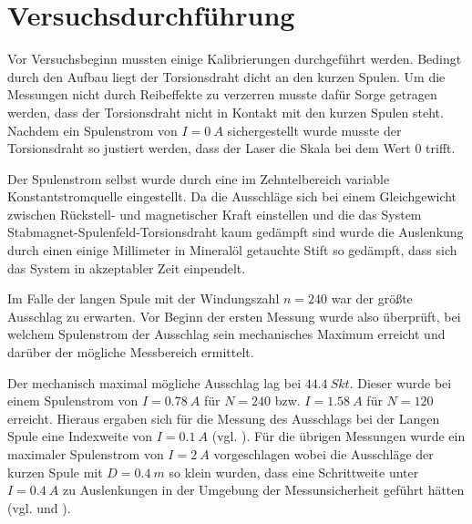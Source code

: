 \chapter{Versuchsdurchführung}
Vor Versuchsbeginn mussten einige Kalibrierungen durchgeführt werden. Bedingt durch den Aufbau liegt der Torsionsdraht
dicht an den kurzen Spulen. Um die Messungen nicht durch Reibeffekte zu verzerren musste dafür Sorge getragen werden,
dass der Torsionsdraht nicht in Kontakt mit den kurzen Spulen steht. Nachdem ein Spulenstrom von $I = \SI{0}{A}$
sichergestellt wurde musste der Torsionsdraht so justiert werden, dass der Laser die Skala bei dem Wert $0$ trifft.
\par\medskip
\hspace{1cm}Der Spulenstrom selbst wurde durch eine im Zehntelbereich variable Konstantstromquelle eingestellt.
Da die Ausschläge sich bei einem Gleichgewicht zwischen Rückstell- und magnetischer Kraft einstellen und die das System
Stabmagnet-Spulenfeld-Torsionsdraht kaum gedämpft sind wurde die Auslenkung durch einen einige Millimeter in Mineralöl
getauchte Stift so gedämpft, dass sich das System in akzeptabler Zeit einpendelt.
\par
\hspace{1cm}Im Falle der langen Spule mit der Windungszahl $n=240$ war der größte Ausschlag zu erwarten. Vor Beginn der ersten Messung
wurde also überprüft, bei welchem Spulenstrom der Ausschlag sein mechanisches Maximum erreicht und darüber der mögliche
Messbereich ermittelt.
\par
\hspace{1cm}Der mechanisch maximal mögliche Ausschlag lag bei $\SI{44,4}{Skt}$. Dieser wurde bei einem Spulenstrom von $I=\SI{0,78}{A}$
für $N=240$ bzw. $I=\SI{1,58}{A}$ für $N=120$ erreicht. Hieraus ergaben sich für die Messung des Ausschlags bei der Langen
Spule eine Indexweite von $I = \SI{0,1}{A}$ (vgl. ). Für die übrigen Messungen wurde ein maximaler
Spulenstrom von $I=\SI{2}{A}$ vorgeschlagen wobei die Ausschläge der kurzen Spule mit $D=\SI{0,4}{m}$ so klein wurden, dass
eine Schrittweite unter $I=\SI{0,4}{A}$ zu Auslenkungen in der Umgebung der Messunsicherheit geführt hätten (vgl. 
und ).